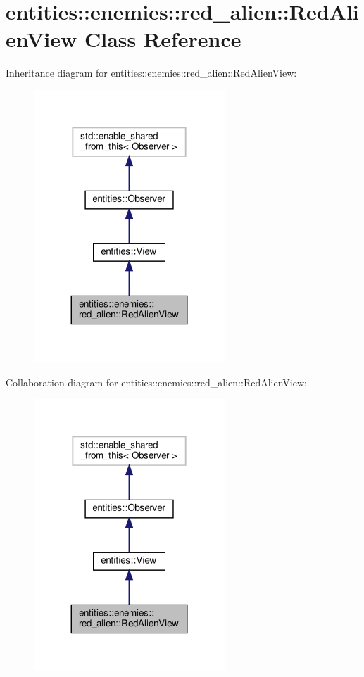 \hypertarget{classentities_1_1enemies_1_1red__alien_1_1RedAlienView}{}\section{entities\+:\+:enemies\+:\+:red\+\_\+alien\+:\+:Red\+Alien\+View Class Reference}
\label{classentities_1_1enemies_1_1red__alien_1_1RedAlienView}


Inheritance diagram for entities\+:\+:enemies\+:\+:red\+\_\+alien\+:\+:Red\+Alien\+View\+:\nopagebreak
\begin{figure}[H]
\begin{center}
\leavevmode
\includegraphics[width=203pt]{classentities_1_1enemies_1_1red__alien_1_1RedAlienView__inherit__graph}
\end{center}
\end{figure}


Collaboration diagram for entities\+:\+:enemies\+:\+:red\+\_\+alien\+:\+:Red\+Alien\+View\+:\nopagebreak
\begin{figure}[H]
\begin{center}
\leavevmode
\includegraphics[width=203pt]{classentities_1_1enemies_1_1red__alien_1_1RedAlienView__coll__graph}
\end{center}
\end{figure}
